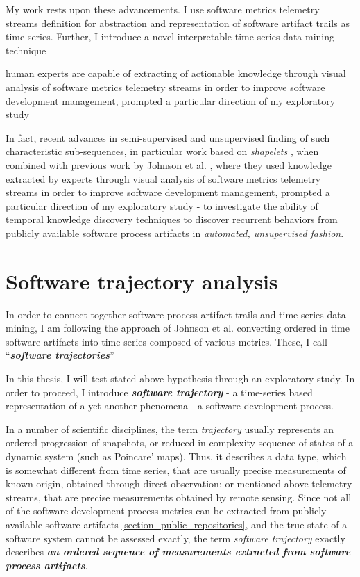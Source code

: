 My work rests upon these advancements. 
I use software metrics telemetry streams definition for abstraction and representation of software artifact 
trails as time series. Further, I introduce a novel interpretable time series data mining technique 

human experts are capable of extracting of actionable knowledge through visual analysis 
of software metrics telemetry streams 
in order to improve software development management, prompted a particular direction of my exploratory 
study 

In fact, recent advances in semi-supervised and unsupervised finding of such characteristic sub-sequences, 
in particular work based on \textit{shapelets} \cite{citeulike:7344347} \cite{citeulike:11957982}
\cite{citeulike:12552293}, when combined with previous work by Johnson et al. \cite{citeulike:12550871}, 
where they used knowledge extracted by experts through visual analysis of software metrics telemetry streams 
in order to improve software development management, prompted a particular direction of my exploratory 
study - to investigate the ability of temporal knowledge discovery techniques to discover recurrent behaviors
from publicly available software process artifacts in \textit{automated, unsupervised fashion}.

\section{Software trajectory analysis}\label{section_trajectory_definition}
In order to connect together software process artifact trails and time series data mining, I am following
the approach of Johnson et al. \cite{citeulike:12550871} converting ordered in time software artifacts into
time series composed of various metrics. These, I call ``\textit{\textbf{software trajectories}}''

In this thesis, I will test stated above hypothesis through an exploratory study. In order to proceed, 
I introduce \textit{\textbf{software trajectory}} - a time-series based representation of a yet another 
phenomena - a software development process. 

In a number of scientific disciplines, the term \textit{trajectory} usually represents 
an ordered progression of snapshots, or reduced in complexity sequence of states of a dynamic 
system (such as Poincare' maps). 
Thus, it describes a data type, which is somewhat different from time series, that are usually precise
measurements of known origin, obtained through direct observation; 
or mentioned above telemetry streams, that are precise measurements obtained by remote 
sensing. Since not all of the software development process metrics can be extracted from publicly 
available software artifacts \ref{section_public_repositories}, and the true state of a software system 
cannot be assessed exactly, the term \textit{software trajectory} exactly describes
\textbf{\textit{an ordered 
sequence of measurements extracted from software process artifacts}}.

